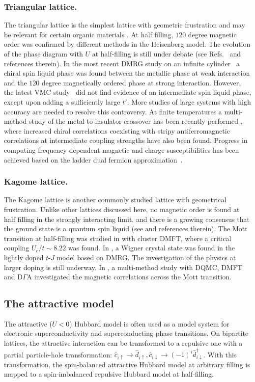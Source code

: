 \documentclass{ar-1col}
\begin{document}
\subsubsection*{Triangular lattice.} The triangular lattice is the simplest lattice with geometric frustration and may be relevant for certain organic materials \cite{Kanoda11}.
At half filling, $120$ degree magnetic order was confirmed by different methods \cite{Capriotti99,White07} in the Heisenberg model. The evolution of the phase diagram with $U$ at half-filling is still under debate (see Refs.~\cite{Szasz20,Tocchio20,Li20A} and references therein). 
In the most recent DMRG study on an infinite cylinder~\cite{Szasz20} a chiral spin liquid phase was found between the metallic phase at weak interaction and the $120$ degree magnetically ordered phase at strong interaction. However, the latest VMC study~\cite{Tocchio20} did not find evidence of an intermediate spin liquid phase, except upon adding a sufficiently large $t'$. More studies of large systems with high accuracy are needed to resolve this controversy.
 At finite temperatures a multi-method study of the metal-to-insulator crossover has been recently performed \cite{Wietek21}, where increased chiral correlations coexisting with stripy antiferromagnetic correlations at intermediate coupling strengths have also been found. Progress in computing frequency-dependent magnetic and charge susceptibilities has been achieved based on the ladder dual fermion approximation~\cite{Li20A}.
%
\subsubsection*{Kagome lattice.} The Kagome lattice is another commonly studied lattice with geometrical frustration. Unlike other lattices discussed here,
no magnetic order is found at half filling in the strongly interacting limit, and there is a growing consensus that the ground state is a quantum spin liquid (see \cite{Liao17} and references therein).  The Mott transition at half-filling was studied in \cite{Ohashi06} with cluster DMFT, where a critical coupling $U_c/t\sim 8.22$ was found. In \cite{Jiang17}, a Wigner crystal state was
found in the lightly doped $t$-$J$ model based on DMRG. The investigation of the physics at larger doping is still underway. In \cite{Kaufmann20}, a multi-method study with DQMC, DMFT and D$\Gamma$A investigated the magnetic correlations across the Mott transition.

\subsection{The attractive model}
The attractive ($U < 0$) Hubbard model is often used as a  model system for electronic superconductivity and superconducting phase transitions.  On bipartite lattices, the attractive interaction can be transformed to a repulsive one
with a partial particle-hole transformation: $\hat c_{i\uparrow}\rightarrow \hat d_{i\uparrow},\hat c_{i\downarrow}\rightarrow(-1)^{i}\hat d_{i\downarrow}^{\dagger}$.
With this transformation, the spin-balanced attractive Hubbard model at arbitrary filling is mapped to a
spin-imbalanced repulsive Hubbard model at half-filling.
\end{document}
